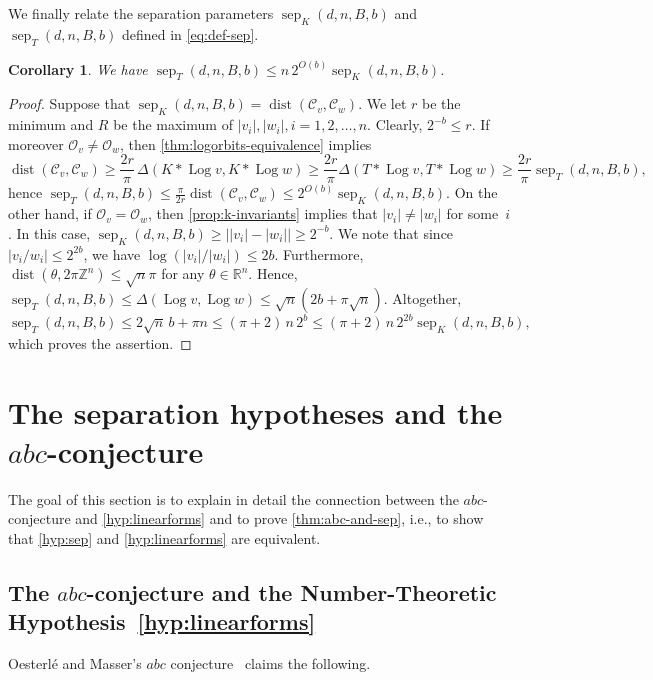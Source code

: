 \documentclass[10pt,a4paper]{article}
\newtheorem{corollary}[theorem]{Corollary}
\theoremstyle{definition}
\DeclareMathOperator{\sep}{sep}
\DeclareMathOperator{\Log}{Log}
\DeclareMathOperator{\dist}{dist}
\newcommand{\ZZ}{\mathbb{Z}}
\newcommand{\RR}{\mathbb{R}}
\newcommand{\OO}{\ensuremath{\mathcal{O}}}
\newcommand{\KK}{\ensuremath{\mathcal{C}}}
\newcommand{\abc}{\texorpdfstring{$abc$}{abc}}
\numberwithin{equation}{section}
\begin{document}
We finally relate the separation parameters $\sep_K(d,n,B,b)$ and $\sep_T(d,n,B,b)$
defined in \cref{eq:def-sep}.

\begin{corollary}\label{cor:rel-btw-seps}
We have $\sep_T(d,n,B,b)\leq n\, 2^{O(b)}\sep_K(d,n,B,b)$.
\end{corollary}

\begin{proof}
Suppose that $\sep_K(d,n,B,b)= \dist(\KK_v,\KK_w)$.
We let $r$ be the minimum and $R$ be the maximum of $|v_i|,|w_i|, i=1,2,\dots,n$.
Clearly, $2^{-b} \le r$.
If moreover $\OO_v\neq\OO_w$, then
\cref{thm:logorbits-equivalence} implies
\[
 \dist(\KK_v,\KK_w)\geq \frac{2r}{\pi} \, \Delta(K\ast\Log v,K\ast\Log w)
    \geq \frac{2r}{\pi}\Delta(T\ast\Log v, T\ast\Log w)
     \geq \frac{2r}{\pi} \sep_T(d,n,B,b) ,
\]
hence
$\sep_T(d,n,B,b) \le \frac{\pi}{2r}\dist(\KK_v,\KK_w) \le 2^{O(b)} \sep_K(d,n,B,b)$.
On the other hand, if $\OO_v=\OO_w$, then \cref{prop:k-invariants} implies that $|v_i|\neq|w_i|$
for some~$i$. In this case,
$\sep_K(d,n,B,b) \ge\Big| |v_i| -|w_i| \Big|\ge 2^{-b}$.
We note that since $|v_i/w_i|\leq 2^{2b}$,  we have $\log(|v_i|/|w_i|)\leq 2b$. Furthermore, $\dist(\theta,2\pi\ZZ^n)\leq \sqrt{n}\pi$ for any $\theta\in\RR^n$. Hence,
$\sep_T(d,n,B,b)\le \Delta(\Log v, \Log w) \le  \sqrt{n}(2b+\pi \sqrt{n})$.
Altogether,
$$
 \sep_T(d,n,B,b)\le 2\sqrt{n}\, b + \pi n \le (\pi+2)\,n\, 2^b \le (\pi+2)\, n\, 2^{2b} \sep_K(d,n,B,b) ,
$$
which proves the assertion.
\end{proof}

\section{The separation hypotheses and the \abc-conjecture}\label{sec:abc}

The goal of this section is to explain in detail the connection between
the \abc-conjecture and \cref{hyp:linearforms} and to prove \cref{thm:abc-and-sep},
i.e., to show that
\cref{hyp:sep} and \cref{hyp:linearforms} are equivalent.


\subsection{The \abc-conjecture and the Number-Theoretic Hypothesis~\ref{hyp:linearforms}}\label{sec:abc-sec1}
Oesterl\'{e} and Masser's $abc$ conjecture~\cite[Conjecture 3]{oesterle} claims the following.
\end{document}
